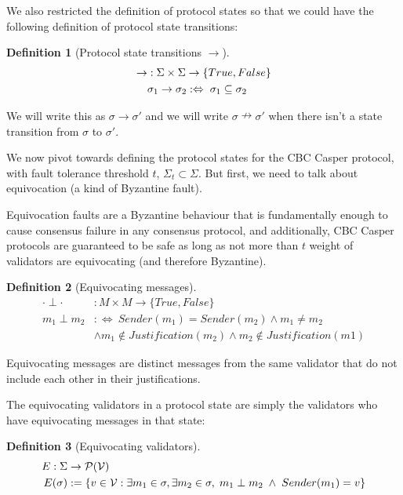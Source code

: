 \documentclass{article}
\theoremstyle{definition}
\newtheorem{defn}{Definition}[section]
\begin{document}
We also restricted the definition of protocol states so that we could have the following definition of protocol state transitions:

\begin{defn}[Protocol state transitions $\to$]
\begin{align}
\to &: \Sigma \times \Sigma \to \{True,False\} \\
&\sigma_1 \to \sigma_2 :\Leftrightarrow \hspace{1mm} \sigma_1 \subseteq \sigma_2
\end{align}
\end{defn}


We will write this as $\sigma \rightarrow \sigma'$ and we will write $\sigma \nrightarrow \sigma'$ when there isn't a state transition from $\sigma$ to $\sigma'$.


We now pivot towards defining the protocol states for the CBC Casper protocol, with fault tolerance threshold $t$, $\Sigma_t \subset \Sigma$. But first, we need to talk about equivocation (a kind of Byzantine fault).

Equivocation faults are a Byzantine behaviour that is fundamentally enough to cause consensus failure in any consensus protocol, and additionally, CBC Casper protocols are guaranteed to be safe as long as not more than $t$ weight of validators are equivocating (and therefore Byzantine).

\begin{defn}[Equivocating messages]
\begin{align}
  \cdot \perp \cdot &: M \times M \to \{True,False\}\\
  m_1 \perp m_2 &:\Leftrightarrow ~ Sender(m_1) = Sender(m_2) \land m_1 \neq m_2 \\
  &\land m_1 \notin Justification(m_2) \land m_2 \notin Justification(m1)
  \end{align}
\end{defn}

Equivocating messages are distinct messages from the same validator that do not include each other in their justifications.

The equivocating validators in a protocol state are simply the validators who have equivocating messages in that state:

\begin{defn}[Equivocating validators]
\begin{align}
E: \Sigma &\to \mathcal{P}(\mathcal{V}) \\
E(\sigma) &:= \{v \in \mathcal{V} : \exists m_1 \in \sigma, \exists m_2 \in \sigma , \hspace{1mm} m_1 \perp m_2 \hspace{1mm} \land \hspace{1mm} Sender(m_1) = v \}
\end{align}
\end{defn}
\end{document}
